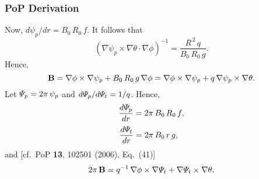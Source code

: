 \documentclass[12pt]{article}
\begin{document}
\subsubsection{PoP Derivation}
Now, $d\psi_p/dr = B_0\,R_0\,f$. It follows that
\begin{equation}
(\nabla\psi_p\times\nabla\theta\cdot\nabla\phi)^{-1}=\frac{R^{\,2}\,q}{B_0\,R_0\,g}.
\end{equation}
Hence,
\begin{equation}
{\bf B} = \nabla\phi\times\nabla\psi_p + B_0\,R_0\,g\,\nabla\phi = \nabla\phi\times\nabla\psi_p + q\,\nabla\psi_p\times\nabla\theta.
\end{equation}
Let ${\mit\Psi}_p = 2\pi\,\psi_p$ and $d{\mit\Psi}_p/d{\mit\Psi}_t = 1/q$. 
Hence,
\begin{align}
\frac{d{\mit\Psi}_p}{dr} &= 2\pi\,B_0\,R_0\,f,\\[0.5ex]
\frac{d{\mit\Psi}_t}{dr} &= 2\pi\,B_0\,r\,g,
\end{align}
and [cf.\ PoP {\bf 13}, 102501 (2006), Eq.~(41)]
\begin{equation}
2\pi\,{\bf B} = q^{-1}\,\nabla\phi\times\nabla{\mit\Psi}_t + \nabla{\mit\Psi}_t\times\nabla\theta.
\end{equation}
\end{document}
